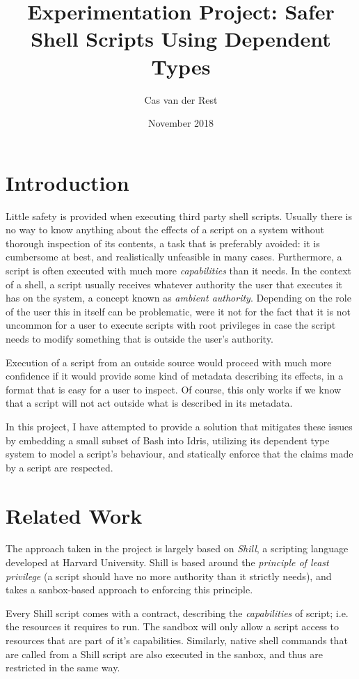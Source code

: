 \documentclass[11pt,a4paper]{article}
\title{Experimentation Project: Safer Shell Scripts Using Dependent Types}
\author{Cas van der Rest}
\date{November 2018}
\begin{document}
\maketitle

\section{Introduction}

Little safety is provided when executing third party shell scripts. Usually there is no way to know anything about the effects of a script on a system without thorough inspection of its contents, a task 
that is preferably avoided: it is cumbersome at best, and realistically unfeasible in many cases. Furthermore, a script is often executed with much more \textit{capabilities} than it needs. In the context 
of a shell, a script usually receives whatever authority the user that executes it has on the system, a concept known as \textit{ambient authority}. Depending on the role of the user this in itself can be 
problematic, were it not for the fact that it is not uncommon for a user to execute scripts with root privileges in case the script needs to modify something that is outside the user's authority. 

Execution of a script from an outside source would proceed with much more confidence if it would provide some kind of metadata describing its effects, in a format that is easy for a user to inspect. Of 
course, this only works if we know that a script will not act outside what is described in its metadata.

In this project, I have attempted to provide a solution that mitigates these issues by embedding a small subset of Bash into Idris\cite{brady13}, utilizing its dependent type system to model a script's 
behaviour, and statically enforce that the claims made by a script are respected. 

\section{Related Work}

The approach taken in the project is largely based on \textit{Shill}\cite{moore14}, a scripting language developed at Harvard University. Shill is based around the \textit{principle of least privilege} (a script should have no more authority than it strictly needs), and takes a sanbox-based approach to enforcing this principle. 

Every Shill script comes with a contract, describing the \textit{capabilities} of script; i.e. the resources it requires to run. The sandbox will only allow a script access to resources that are part of it's capabilities. Similarly, native shell commands that are called from a Shill script are also executed in the sanbox, and thus are restricted in the same way. 
\end{document}
